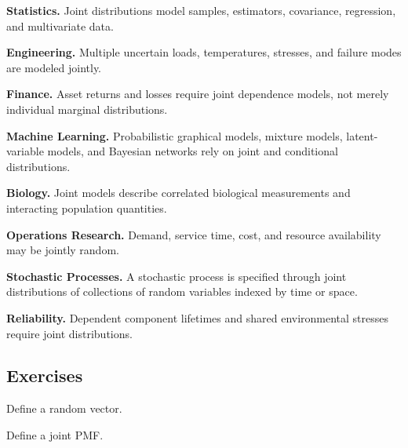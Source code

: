\begin{applicationbox}

\textbf{Statistics.}
Joint distributions model samples, estimators, covariance, regression,
and multivariate data.

\medskip

\textbf{Engineering.}
Multiple uncertain loads, temperatures, stresses, and failure modes are
modeled jointly.

\medskip

\textbf{Finance.}
Asset returns and losses require joint dependence models, not merely
individual marginal distributions.

\medskip

\textbf{Machine Learning.}
Probabilistic graphical models, mixture models, latent-variable models,
and Bayesian networks rely on joint and conditional distributions.

\medskip

\textbf{Biology.}
Joint models describe correlated biological measurements and interacting
population quantities.

\medskip

\textbf{Operations Research.}
Demand, service time, cost, and resource availability may be jointly
random.

\medskip

\textbf{Stochastic Processes.}
A stochastic process is specified through joint distributions of
collections of random variables indexed by time or space.

\medskip

\textbf{Reliability.}
Dependent component lifetimes and shared environmental stresses require
joint distributions.

\end{applicationbox}

\subsection{Exercises}
\label{subsec:joint-distributions-exercises}

\begin{exercise}[1]
Define a random vector.
\end{exercise}

\begin{exercise}[1]
Define a joint PMF.
\end{exercise}

